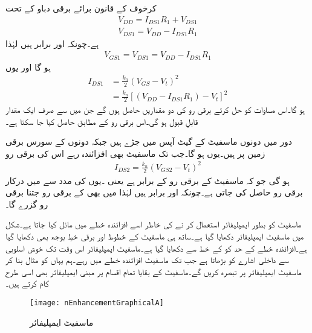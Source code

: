 کرخوف کے قانون برائے برقی دباو کے تحت
\begin{align*}
V_{DD}=I_{DS1}R_1+V_{DS1}\\
V_{DS1}=V_{DD}-I_{DS1}R_1
\end{align*}
ہے۔چونکہ  اور  برابر ہیں لہٰذا
\begin{align*}
V_{GS1}=V_{DS1}=V_{DD}-I_{DS1}R_1
\end{align*}
ہو گا اور یوں
\begin{align*}
I_{DS1}&=\frac{k_n}{2}\left(V_{GS}-V_t \right )^2 \\
&=\frac{k_n}{2} \left[\left(V_{DD}-I_{DS1} R_1 \right )-V_t \right ]^{2}
\end{align*}
ہو گا۔اس مساوات کو حل کرتے برقی رو کی دو مقداریں حاصل ہوں گے جن میں سے صرف ایک مقدار قابلِ قبول ہو گی۔اس برقی رو کے مطابق  حاصل کیا جا سکتا ہے۔

دور میں دونوں ماسفیٹ کے گیٹ آپس میں جڑے ہیں جبکہ دونوں کے سورس برقی زمین پر ہیں۔یوں  ہو گا۔جب تک ماسفیٹ  بھی افزائندہ رہے اس کی برقی رو
\begin{align*}
I_{DS2}=\frac{k_n}{2} \left(V_{GS2}-V_t \right )^2
\end{align*}
ہو گی جو کہ ماسفیٹ  کے برقی رو کے برابر ہے یعنی  ۔یوں   کی مدد سے   میں درکار برقی رو حاصل کی جاتی ہے۔چونکہ   اور  برابر ہیں لہٰذا  میں بھی  کے برقی رو جتنا برقی رو گزرے گا۔


ماسفیٹ کو بطور ایمپلیفائر استعمال کر نے کی خاطر اسے افزائندہ خطے میں مائل کیا جاتا ہے۔شکل  میں ماسفیٹ ایمپلیفائر دکھایا گیا ہے۔ساتھ ہی ماسفیٹ کے خطوط اور برقی خطِ بوجھ بھی دکھایا گیا ہے۔افزائندہ خطے کے حد کو  کے خط سے دکھایا گیا ہے۔ماسفیٹ ایمپلیفائر اس وقت تک خوش اسلوبی سے داخلی اشارے کو بڑھاتا ہے جب تک ماسفیٹ افزائندہ خطے میں رہے۔ہم یہاں  کو مثال بنا کر ماسفیٹ ایمپلیفائر پر تبصرہ کریں گے۔ماسفیٹ کے بقایا تمام اقسام پر مبنی ایمپلیفائر بھی اسی طرح کام کرتے ہیں۔
\begin{figure}
\centering
\texttt{[image: nEnhancementGraphicalA]}
\caption{ماسفیٹ ایمپلیفائر}
\label{شکل_ماسفیٹ_ایمپلیفائر_ترسیمی_تجزیہ}
\end{figure}


